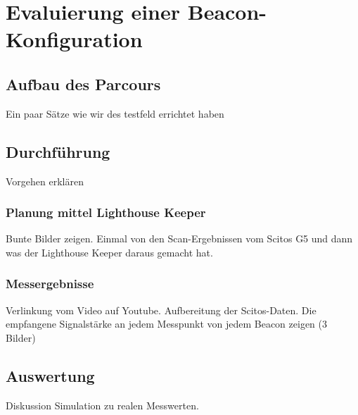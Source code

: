 \chapter{Evaluierung einer Beacon-Konfiguration}

\section{Aufbau des Parcours}
Ein paar Sätze wie wir des testfeld errichtet haben 

\section{Durchführung}
Vorgehen erklären
\subsection{Planung mittel Lighthouse Keeper}
Bunte Bilder zeigen. Einmal von den Scan-Ergebnissen vom Scitos G5 und dann was der Lighthouse Keeper daraus gemacht hat.
\subsection{Messergebnisse}
Verlinkung vom Video auf Youtube. Aufbereitung der Scitos-Daten. Die empfangene Signalstärke an jedem Messpunkt von jedem Beacon zeigen (3 Bilder)

\section{Auswertung}
Diskussion Simulation zu realen Messwerten.

